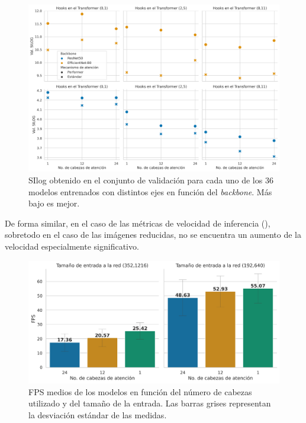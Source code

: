 \begin{figure}[H]
\centering
\includegraphics[width=\linewidth]{imagenes/Resultados/SIlog_val_split.png} 
\captionsetup{width=.95\linewidth}
\caption{SIlog obtenido en el conjunto de validación para cada uno de los 36 modelos entrenados con distintos ejes en función del \textit{backbone}. Más bajo es mejor.}
\label{fig:SIlog-val-split}
\end{figure}

De forma similar, en el caso de las métricas de velocidad de inferencia (), sobretodo en el caso de las imágenes reducidas, no se encuentra un aumento de la velocidad especialmente significativo.

\begin{figure}[H]
\centering
\includegraphics[width=0.75\linewidth]{imagenes/Resultados/velocidad_inferencia_cabezas_atencion.png} 
\captionsetup{width=.8\linewidth}
\caption{FPS medios de los modelos en función del número de cabezas utilizado y del tamaño de la entrada. Las barras grises representan la desviación estándar de las medidas.}
\label{fig:resultados-inf-num-cabezas}
\end{figure}
























